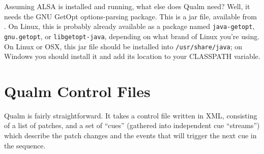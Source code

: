 \documentclass{article}
\newcommand{\q}{{\textsf{Qualm}}\xspace}
\newcommand{\code}[1]{{\tt #1}}
\begin{document}
Assuming ALSA is installed and running, what else does \q need?  Well,
it needs the GNU GetOpt options-parsing package.  This is a jar file,
available from .  On
Linux, this is probably already available as a package named
\code{java-getopt}, \code{gnu.getopt}, or \code{libgetopt-java},
depending on what brand of Linux you're using.  On Linux or OSX, this
jar file should be installed into \code{/usr/share/java}; on Windows
you should install it and add its location to your CLASSPATH variable.

\begin{latexonly}
\newpage
\end{latexonly}
\section{\q Control Files}

\q is fairly straightforward.  It takes a control file written in
XML, consisting of a list of patches, and a set of ``cues'' (gathered into
independent cue ``streams'') which describe the patch changes and the
events that will trigger the next cue in the sequence.
\end{document}
